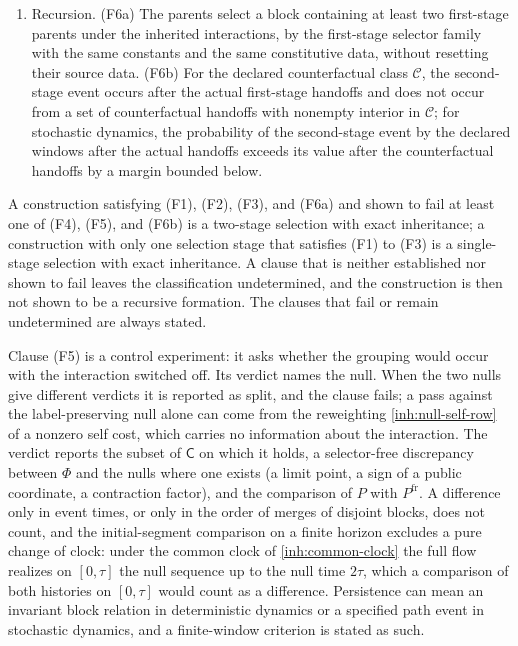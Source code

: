 \begin{enumerate}
\item[(F6)] Recursion. (F6a) The parents select a block containing at least
two first-stage parents under the inherited interactions, by the
first-stage selector family with the same constants and the same
constitutive data, without resetting their source data. (F6b) For the
declared counterfactual class $\mathcal C$, the second-stage event occurs
after the actual first-stage handoffs and does not occur from a set of
counterfactual handoffs with nonempty interior in $\mathcal C$; for
stochastic dynamics, the probability of the second-stage event by the
declared windows after the actual handoffs exceeds its value after the
counterfactual handoffs by a margin bounded below.
\end{enumerate}
A construction satisfying (F1), (F2), (F3), and (F6a) and shown to fail at
least one of (F4), (F5), and (F6b) is a two-stage selection with exact
inheritance; a construction with only one selection stage that satisfies
(F1) to (F3) is a single-stage selection with exact inheritance. A clause
that is neither established nor shown to fail leaves the classification
undetermined, and the construction is then not shown to be a recursive
formation. The clauses that fail or remain undetermined are always stated.

Clause (F5) is a control experiment: it asks whether the grouping would
occur with the interaction switched off. Its verdict names the null. When
the two nulls give different verdicts it is reported as split, and the
clause fails; a pass against the label-preserving null alone can come from
the reweighting \cref{inh:null-self-row} of a nonzero self cost, which
carries no information about the interaction. The verdict reports the subset
of $\mathsf C$ on which it holds, a selector-free discrepancy between $\Phi$
and the nulls where one exists (a limit point, a sign of a public coordinate,
a contraction factor), and the comparison of $P$ with $P^{\mathrm{fr}}$.
A difference only in event times, or only in the order of merges of
disjoint blocks, does not count, and the initial-segment comparison on a
finite horizon excludes a pure change of clock: under the common clock of
\cref{inh:common-clock} the full flow realizes on $[0,\tau]$ the null
sequence up to the null time $2\tau$, which a comparison of both histories on
$[0,\tau]$ would count as a difference. Persistence can mean an invariant
block relation in deterministic dynamics or a specified path event in
stochastic dynamics, and a finite-window criterion is stated as such.

